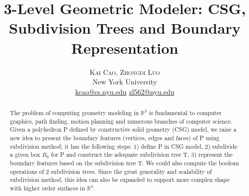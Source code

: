 \documentclass[twoside]{article}
\title{\vspace{-15mm}\fontsize{20pt}{10pt}\selectfont\textbf{3-Level Geometric Modeler: CSG, Subdivision Trees and Boundary Representation}} %
\author{
\large
\textsc{Kai Cao, Zhongdi Luo}\iffalse \thanks{Thanks to Chee Yap for his help}\fi \\[2mm] %
\normalsize New York University \\ %
\normalsize \href{mailto:kcao@cs.nyu.edu}{kcao@cs.nyu.edu} %
\normalsize \href{mailto:zl562@nyu.edu}{zl562@nyu.edu} %
\vspace{-5mm}
}
\date{}
\begin{document}
\maketitle %

\thispagestyle{fancy} %


\begin{abstract}

\noindent The problem of computing geometry modeling in $\mathbb{R}^3$ is fundamental to computer graphics, path finding, motion planning and numerous branches of computer science. Given a polyhedron P defined by constructive solid geometry (CSG) model, we raise a new idea to present the boundary features (vertices, edges and faces) of P using subdivision method; it has the following steps: 1) define P in CSG model, 2) subdivide a given box $B_0$ for P and construct the adequate subdivision tree T, 3) represent the boundary features based on the subdivision tree T. We could also compute the boolean operations of 2 subdivision trees. Since the great generality and scalability of subdivision method, this idea can also be expanded to support more complex shape with higher order surfaces in $\mathbb{R}^3$.

\end{abstract}

\end{document}
